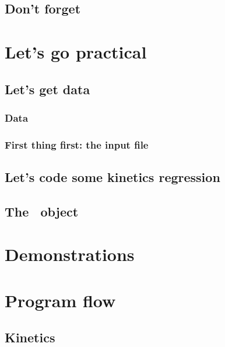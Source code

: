 \documentclass[twoside]{report}
\begin{document}
\section{\GRVY}

\section{Don't forget \Doxygen}
\label{dox}


\chapter{Let's go practical}
\chaptermark{\ANTIOCHPrac}
\label{Antioch:practice}

\section{Let's get data}

\subsection{Data}
\label{kin:data}


\subsection{First thing first: the input file}


\section{Let's code some kinetics regression}


\section{The \Units\ object}


\appendix
\chapter{Demonstrations}
\label{demo}


\chapter{Program flow}
\label{progflow}

\section{Kinetics}
\label{progflow:kinetics}

\end{document}
